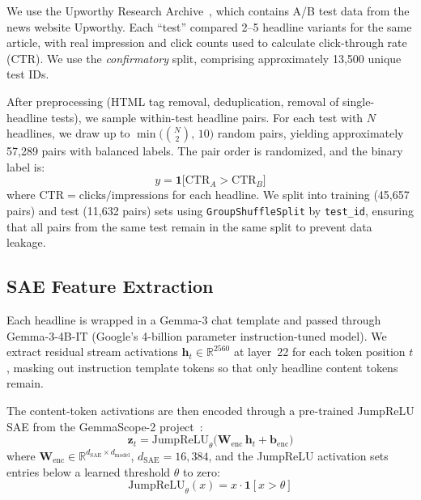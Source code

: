 \documentclass[sigconf,natbib=false, language=english]{acmart}
\begin{document}
We use the Upworthy Research Archive~\cite{matias2021upworthy}, which contains A/B test data from the news website Upworthy. Each ``test'' compared 2--5 headline variants for the same article, with real impression and click counts used to calculate click-through rate (CTR). We use the \emph{confirmatory} split, comprising approximately 13,500 unique test IDs.

After preprocessing (HTML tag removal, deduplication, removal of single-headline tests), we sample within-test headline pairs. For each test with $N$ headlines, we draw up to $\min\bigl(\binom{N}{2},\, 10\bigr)$ random pairs, yielding approximately 57,289 pairs with balanced labels. The pair order is randomized, and the binary label is:
\begin{equation}
    y = \mathbf{1}\bigl[\mathrm{CTR}_A > \mathrm{CTR}_B\bigr]
    \label{eq:label}
\end{equation}
where $\mathrm{CTR} = \text{clicks} / \text{impressions}$ for each headline. We split into training (45,657 pairs) and test (11,632 pairs) sets using \texttt{GroupShuffleSplit} by \texttt{test\_id}, ensuring that all pairs from the same test remain in the same split to prevent data leakage.

\subsection{SAE Feature Extraction}

Each headline is wrapped in a Gemma-3 chat template and passed through Gemma-3-4B-IT (Google's 4-billion parameter instruction-tuned model). We extract residual stream activations $\mathbf{h}_t \in \mathbb{R}^{2560}$ at layer~22 for each token position $t$, masking out instruction template tokens so that only headline content tokens remain.

The content-token activations are then encoded through a pre-trained JumpReLU SAE from the GemmaScope-2 project~\cite{lieberum2024gemma}:
\begin{equation}
    \mathbf{z}_t = \mathrm{JumpReLU}_\theta\!\bigl(\mathbf{W}_{\mathrm{enc}}\,\mathbf{h}_t + \mathbf{b}_{\mathrm{enc}}\bigr)
    \label{eq:sae}
\end{equation}
where $\mathbf{W}_{\mathrm{enc}} \in \mathbb{R}^{d_{\mathrm{SAE}} \times d_{\mathrm{model}}}$, $d_{\mathrm{SAE}} = 16{,}384$, and the JumpReLU activation sets entries below a learned threshold $\theta$ to zero:
\begin{equation}
    \mathrm{JumpReLU}_\theta(x) = x \cdot \mathbf{1}[x > \theta]
    \label{eq:jumprelu}
\end{equation}
\end{document}
